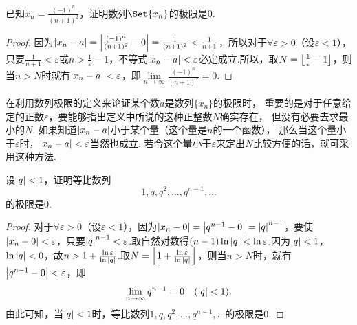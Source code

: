 \begin{example}
已知\(x_n = \frac{(-1)^n}{(n+1)^2}\)，证明数列\(\Set{x_n}\)的极限是\(0\).
\begin{proof}
因为\(\abs{x_n - a} = \abs{\frac{(-1)^n}{(n+1)^2}-0} = \frac{1}{(n+1)^2} < \frac{1}{n+1}\)，所以对于\(\forall\varepsilon>0\)（设\(\varepsilon<1\)），只要\(\frac{1}{n+1}<\varepsilon\)或\(n>\frac{1}{\varepsilon}-1\)，不等式\(\abs{x_n-a}<\varepsilon\)必定成立.所以，取\(N=\floor*{\frac{1}{\varepsilon}-1}\)，则当\(n>N\)时就有\(\abs{x_n - a}<\varepsilon\)，即\(\lim\limits_{n\to\infty}\frac{(-1)^n}{(n+1)^2}=0\).
\end{proof}
\end{example}

在利用数列极限的定义来论证某个数\(a\)是数列\(\{x_n\}\)的极限时，%
重要的是对于任意给定的正数\(\varepsilon\)，要能够指出定义中所说的这种正整数\(N\)确实存在，%
但没有必要去求最小的\(N\).
如果知道\(\abs{x_n-a}\)小于某个量（这个量是\(n\)的一个函数），%
那么当这个量小于\(\varepsilon\)时，\(\abs{x_n-a}<\varepsilon\)当然也成立.
若令这个量小于\(\varepsilon\)来定出\(N\)比较方便的话，就可采用这种方法.

\begin{example}
设\(\abs{q}<1\)，证明等比数列\[
1,q,q^2,\dotsc,q^{n-1},\dotsc
\]的极限是\(0\).
\begin{proof}
对于\(\forall\varepsilon>0\)（设\(\varepsilon<1\)），因为\(\abs{x_n-0}=\abs{q^{n-1}-0}=\abs{q}^{n-1}\)，要使\(\abs{x_n-0}<\varepsilon\)，只要\(\abs{q}^{n-1}<\varepsilon\).取自然对数得\((n-1)\ln\abs{q}<\ln\varepsilon\).因为\(\abs{q}<1\)，\(\ln\abs{q}<0\)，故\(n>1+\frac{\ln\varepsilon}{\ln\abs{q}}\).取\(N=\floor*{1+\frac{\ln\varepsilon}{\ln\abs{q}}}\)，则当\(n>N\)时，就有\(\abs{q^{n-1}-0}<\varepsilon\)，即
\begin{equation}
\lim\limits_{n\to\infty}q^{n-1}=0
\quad(\abs{q}<1).
\end{equation}
由此可知，当\(\abs{q}<1\)时，等比数列\(1,q,q^2,\dotsc,q^{n-1},\dotsc\)的极限是\(0\).
\end{proof}
\end{example}

